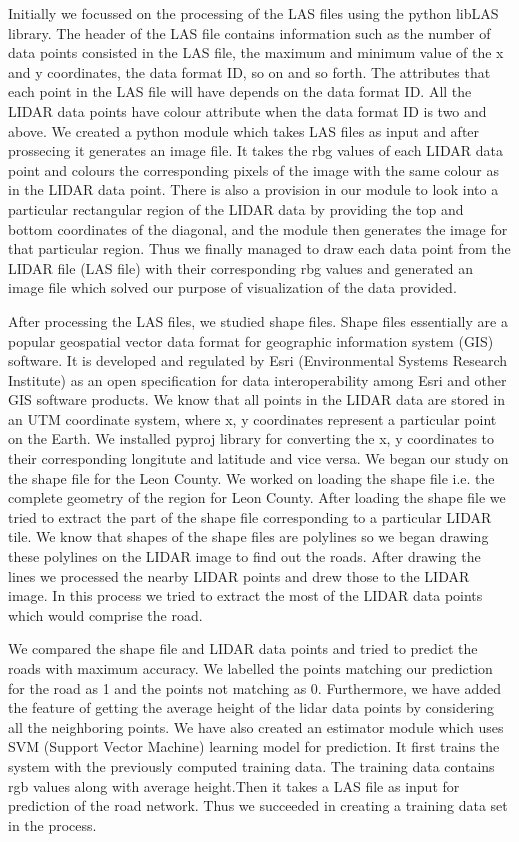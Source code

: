 \documentclass[12pt,letterpaper]{article}
\begin{document}
Initially we focussed on the processing of the LAS files using the python libLAS library. The header of the LAS file contains information such as the number of data points consisted in the LAS file, the maximum and minimum value of the x and y coordinates, the data format ID, so on and so forth. The attributes that each point in the LAS file will have depends on the data format ID. All the LIDAR data points have colour attribute when the data format ID is two and above. We created a python module which takes LAS files as input and after prossecing it generates an image file. It takes the rbg values of each LIDAR data point and colours the corresponding pixels of the image with the same colour as in the LIDAR data point. There is also a provision in our module to look into a particular rectangular region of the LIDAR data by providing the top and bottom coordinates of the diagonal, and the module then generates the image for that particular region. Thus we finally managed to draw each data point from the LIDAR file (LAS file) with their corresponding rbg values and generated an image file which solved our purpose of visualization of the data provided.

After processing the LAS files, we studied shape files. Shape files essentially are a popular geospatial vector data format for geographic information system (GIS) software. It is developed and regulated by Esri (Environmental Systems Research Institute) as an open specification for data interoperability among Esri and other GIS software products. We know that all points in the LIDAR data are stored in an UTM coordinate system, where x, y coordinates represent a particular point on the Earth. We installed pyproj library for converting the x, y coordinates to their corresponding longitute and latitude and vice versa. We began our study on the shape file for the Leon County. We worked on loading the shape file i.e. the complete geometry of the region for Leon County. After loading the shape file we tried to extract the part of the shape file corresponding to a particular LIDAR tile. We know that shapes of the shape files are polylines so we began drawing these polylines on the LIDAR image to find out the roads. After drawing the lines we processed the nearby LIDAR points and drew those to the LIDAR image. In this process we tried to extract the most of the LIDAR data points which would comprise the road. 

We compared the shape file and LIDAR data points and tried to predict the roads with maximum accuracy. We labelled the points matching our prediction for the road as 1 and the points not matching as 0. Furthermore, we have added the feature of getting the average height of the lidar data points by considering all the neighboring points. We have also created an estimator module which uses SVM (Support Vector Machine) learning model for prediction. It first trains the system with the previously computed training data. The training data contains rgb values along with average height.Then it takes a LAS file as input for prediction of the road network. Thus we succeeded in creating a training data set in the process.
\end{document}
